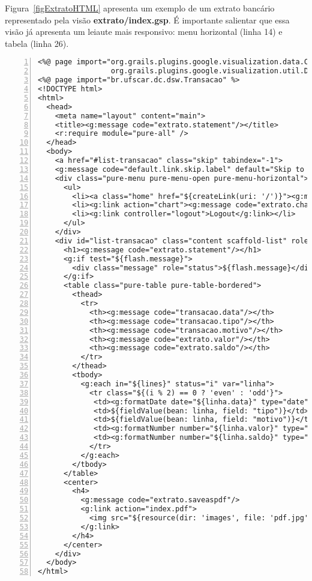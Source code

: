 \vspace{0.3cm}

\noindent  Figura~\ref{figExtratoHTML}  apresenta   um  exemplo  de  um  extrato
bancário representado pela visão {\bf extrato/index.gsp}. É importante salientar
que essa visão  já apresenta um leiaute mais  responsivo: menu horizontal (linha
14) e tabela (linha 26). 

\vspace{0.2cm}

\begin{lstlisting}[caption=Visão {\bf extrato/index.gsp}, frame=trBL, float=htbp,
    label=codExtratoIndex, numbers=left]
<%@ page import="org.grails.plugins.google.visualization.data.Cell; 
                 org.grails.plugins.google.visualization.util.DateUtil" %>
<%@ page import="br.ufscar.dc.dsw.Transacao" %>
<!DOCTYPE html>
<html>
  <head>
    <meta name="layout" content="main">
    <title><g:message code="extrato.statement"/></title>
    <r:require module="pure-all" />
  </head>
  <body>
    <a href="#list-transacao" class="skip" tabindex="-1">
    <g:message code="default.link.skip.label" default="Skip to content&hellip;"/></a>
    <div class="pure-menu pure-menu-open pure-menu-horizontal">
      <ul>
        <li><a class="home" href="${createLink(uri: '/')}"><g:message code="default.home.label"/></a></li>
        <li><g:link action="chart"><g:message code="extrato.chart" default="Chart" /></g:link></li>
        <li><g:link controller="logout">Logout</g:link></li>
      </ul>
    </div>
    <div id="list-transacao" class="content scaffold-list" role="main">
      <h1><g:message code="extrato.statement"/></h1>
      <g:if test="${flash.message}">
        <div class="message" role="status">${flash.message}</div>
      </g:if>
      <table class="pure-table pure-table-bordered">
        <thead>
          <tr>
            <th><g:message code="transacao.data"/></th>
            <th><g:message code="transacao.tipo"/></th>
            <th><g:message code="transacao.motivo"/></th>
            <th><g:message code="extrato.valor"/></th>
            <th><g:message code="extrato.saldo"/></th>
          </tr>
        </thead>
        <tbody>
          <g:each in="${lines}" status="i" var="linha">
            <tr class="${(i % 2) == 0 ? 'even' : 'odd'}">
             <td><g:formatDate date="${linha.data}" type="date" style="SHORT"/></td>
             <td>${fieldValue(bean: linha, field: "tipo")}</td>
             <td>${fieldValue(bean: linha, field: "motivo")}</td>
             <td><g:formatNumber number="${linha.valor}" type="currency" /></td>
             <td><g:formatNumber number="${linha.saldo}" type="currency" /></td>
            </tr>
          </g:each>
        </tbody>
      </table>
      <center>
        <h4>
          <g:message code="extrato.saveaspdf"/>
          <g:link action="index.pdf">
            <img src="${resource(dir: 'images', file: 'pdf.jpg')}" alt="PDF" width="18px"/>
          </g:link>
        </h4>
      </center>
    </div>
  </body>
</html>
\end{lstlisting}


